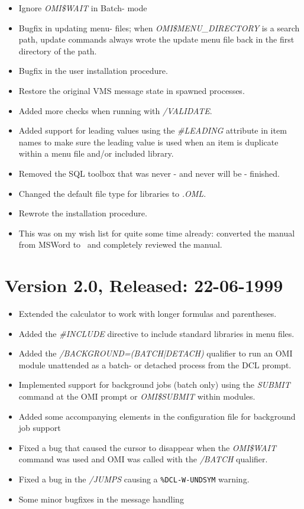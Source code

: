 \documentclass[a4paper]{book}
\begin{document}
\begin{itemize}
\item Ignore \textsl{OMI{\$}WAIT} in Batch- mode
\item Bugfix in updating menu- files; when \textsl{OMI{\$}MENU{\_}DIRECTORY} is a search path, update commands always wrote the update menu file back in the first directory of the path.
\item Bugfix in the user installation procedure.
\item Restore the original VMS message state in spawned processes.
\item Added more checks when running with \textsl{/VALIDATE}.
\item Added support for leading values using the \textsl{{\#}LEADING} attribute in item names to make sure the leading value is used when an item is duplicate within a menu file and/or included library.
\item Removed the SQL toolbox that was never - and never will be - finished.
\item Changed the default file type for libraries to \textsl{.OML}.
\item Rewrote the installation procedure.
\item This was on my wish list for quite some time already: converted the manual from MSWord to \LaTeXe\, and completely reviewed the manual.
\end{itemize}

\section*{Version 2.0, Released: 22-06-1999}

\begin{itemize}
\item Extended the calculator to work with longer formulas and parentheses.
\item Added the \textsl{{\#}INCLUDE} directive to include standard libraries in menu files.
\item Added the \textsl{/BACKGROUND=(BATCH|DETACH)} qualifier to run an OMI module unattended as a batch- or detached process from the DCL prompt.
\item Implemented support for background jobs (batch only) using the \textsl{SUBMIT} command at the OMI prompt or \textsl{OMI{\$}SUBMIT} within modules.
\item Added some accompanying elements in the configuration file for background job support
\item Fixed a bug that caused the cursor to disappear when the \textsl{OMI{\$}WAIT }command was used and OMI was called with the \textsl{/BATCH} qualifier.
\item Fixed a bug in the \textsl{/JUMPS} causing a \texttt{\%DCL-W-UNDSYM} warning.
\item Some minor bugfixes in the message handling
\end{itemize}
\end{document}
